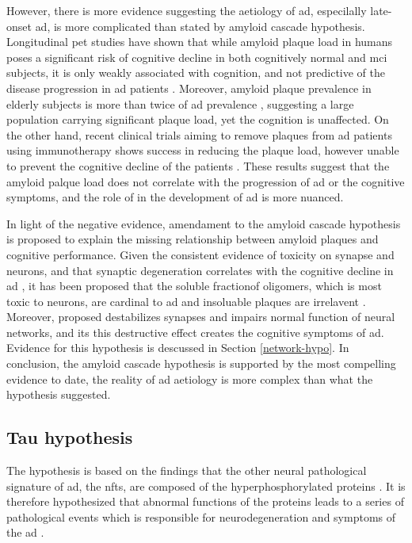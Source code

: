 However, there is more evidence suggesting the aetiology of \gls{ad}, especilally late-onset \gls{ad}, is more complicated than stated by amyloid cascade hypothesis. Longitudinal \gls{pet} studies have shown that while amyloid plaque load in humans poses a significant risk of cognitive decline in both cognitively normal and \gls{mci} subjects, it is only weakly associated with cognition, and not predictive of the disease progression in \gls{ad} patients \citep{chen14}. Moreover, amyloid plaque prevalence in elderly subjects is more than twice of \gls{ad} prevalence \citep{rowe10, ad16}, suggesting a large population carrying significant plaque load, yet the cognition is unaffected. On the other hand, recent clinical trials aiming to remove plaques from \gls{ad} patients using immunotherapy shows success in reducing the plaque load, however unable to prevent the cognitive decline of the patients \citep{farlow15, siemers16, sevigny16}. These results suggest that the amyloid palque load does not correlate with the progression of \gls{ad} or the cognitive symptoms, and the role of \abeta in the development of \gls{ad} is more nuanced. 

In light of the negative evidence, amendament to the amyloid cascade hypothesis is proposed to explain the missing relationship between amyloid plaques and cognitive performance. Given the consistent evidence of \abeta toxicity on synapse and neurons\citep{ferreira15}, and that synaptic degeneration correlates with the cognitive decline in \gls{ad} \citep{selkoe02, coleman04}, it has been proposed that the soluble fractionof \abeta oligomers, which is most toxic to neurons, are cardinal to \gls{ad} and insoluable plaques are irrelavent \citep{ferreira15}. Moreover, \citet{canter16} proposed \abeta destabilizes synapses and impairs normal function of neural networks, and its this destructive effect creates the cognitive symptoms of \gls{ad}. Evidence for this hypothesis is descussed in Section \ref{network-hypo}. In conclusion, the amyloid cascade hypothesis is supported by the most compelling evidence to date, the reality of \gls{ad} aetiology is more complex than what the hypothesis suggested.

\subsection{Tau hypothesis}

The \atau hypothesis is based on the findings that the other neural pathological signature of \gls{ad}, the \glspl{nft}, are composed of the hyperphosphorylated \atau proteins \citep{grundke-iqbal86}. It is therefore hypothesized that abnormal functions of the \atau proteins leads to a series of pathological events which is responsible for neurodegeneration and symptoms of the \gls{ad} \citep{goedert11}.

